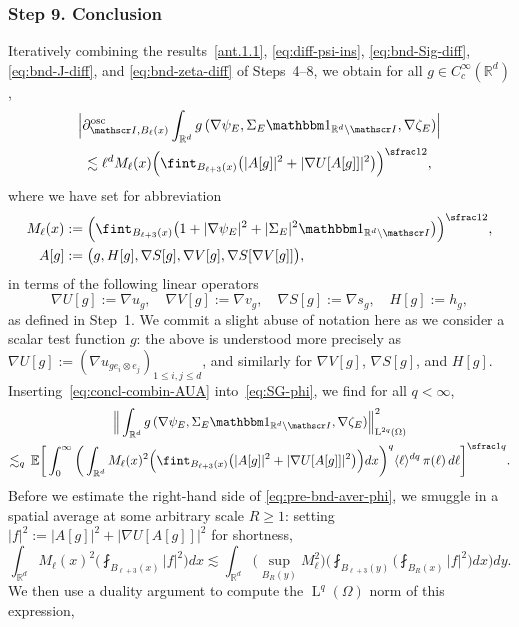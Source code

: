 \documentclass[JEP,XML,SOM,Unicode,published]{cedram}
\let\mathcal\mathscr
\let\mathds\mathbbm
\theoremstyle{plain}
\theoremstyle{definition}
\newcommand{\R}{\mathbb R}
\newcommand{\Ic}{\mathcal I}
\newcommand{\ee}{e}
\newcommand{\Ld}{\operatorname{L}}
\newcommand{\step}[1]{\subsubsection*{Step #1}}
\newcommand{\E}{\mathbb{E}}
\begin{document}
\step{9. Conclusion}
Iteratively combining the results~\eqref{ant.1.1}, \eqref{eq:diff-psi-ins}, \eqref{eq:bnd-Sig-diff}, \eqref{eq:bnd-J-diff}, and \eqref{eq:bnd-zeta-diff} of Steps~4--8,
we obtain for all $g\in C^\infty_c(\R^d)$,
\begin{multline}\label{eq:concl-combin-AUA}
\Big|\partial^{\operatorname{osc}}_{\Ic ,B_\ell(x)}\int_{\R^d}g\,(\nabla \psi_E,\Sigma_E\mathds1_{\R^d\setminus\Ic},\nabla\zeta_E)\Big|\\
\lesssim \ell^dM_\ell(x)\Big(\fint_{B_{\ell+3}(x)}\big(|A[g]|^2+|\nabla U [A[g]]|^2\big)\Big)^{\sfrac12},
\end{multline}
where we have set for abbreviation
\begin{align*}
M_\ell(x)&:= \Big(\fint_{B_{\ell+3}(x)}\big(1+|\nabla\psi_E|^2+|\Sigma_E|^2\mathds1_{\R^d\setminus\Ic}\big)\Big)^{\sfrac12},\\
A[g]&:= \big(g,H[g],\nabla S[g],\nabla V[g],\nabla S[\nabla V[g]]\big),
\end{align*}
in terms of the following linear operators
\[\nabla U[g]:=\nabla u_g,\quad \nabla V[g]:=\nabla v_g,\quad \nabla S[g]:=\nabla s_g,\quad H[g]:=h_g,\]
as defined in Step~1. We commit a slight abuse of notation here as we consider a scalar test function $g$: the above is understood more precisely as $\nabla U[g]:=(\nabla u_{g\ee_i\otimes\ee_j})_{1\le i,j\le d}$, and similarly for $\nabla V[g]$, $\nabla S[g]$, and $H[g]$.
Inserting~\eqref{eq:concl-combin-AUA} into~\eqref{eq:SG-phi}, we find for all $q<\infty$,
\begin{multline}\label{eq:pre-bnd-aver-phi}
\Big\|\int_{\R^d}g\,(\nabla \psi_E,\Sigma_E\mathds1_{\R^d\setminus\Ic},\nabla\zeta_E)\Big\|_{\Ld^{2q}(\Omega)}^{2}\\
\lesssim_q \,\E\bigg[\int_0^\infty\bigg(\int_{\R^d}M_\ell(x)^2\Big(\fint_{B_{\ell+3}(x)}\big(|A[g]|^2+|\nabla U [A[g]]|^2\big)\Big)dx\bigg)^q\langle\ell\rangle^{dq}\,\pi(\ell)\,d\ell\bigg]^{\sfrac1q}.
\end{multline}
Before we estimate the right-hand side of \eqref{eq:pre-bnd-aver-phi}, we smuggle in a spatial average at some arbitrary scale $R\ge1$: setting $|f|^2:=|A[g]|^2+|\nabla U [A[g]]|^2$ for shortness,
\begin{equation*}
\int_{\R^d}M_\ell(x)^2\Big(\fint_{B_{\ell+3}(x)} |f|^2\Big)dx
\lesssim \int_{\R^d}\Big(\sup_{B_R(y)}M_\ell^2\Big)\bigg(\fint_{B_{\ell+3}(y)}\Big(\fint_{B_{R}(x)}|f|^2\Big)dx\bigg)dy.
\end{equation*}
We then use a duality argument to compute the $\Ld^q(\Omega)$ norm of this expression,
\end{document}
